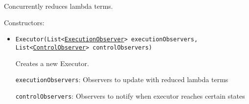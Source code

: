 Concurrently reduces lambda terms.

Constructors:
\begin{itemize}
\item \texttt{Executor(List<\hyperref[type:edu.kit.wavelength.client.view.execution.ExecutionObserver]{ExecutionObserver}> executionObservers, List<\hyperref[type:edu.kit.wavelength.client.view.execution.ControlObserver]{ControlObserver}> controlObservers)}

Creates a new Executor.

\texttt{executionObservers}: Observers to update with reduced lambda terms

\texttt{controlObservers}: Observers to notify when executor reaches certain states

\end{itemize}

